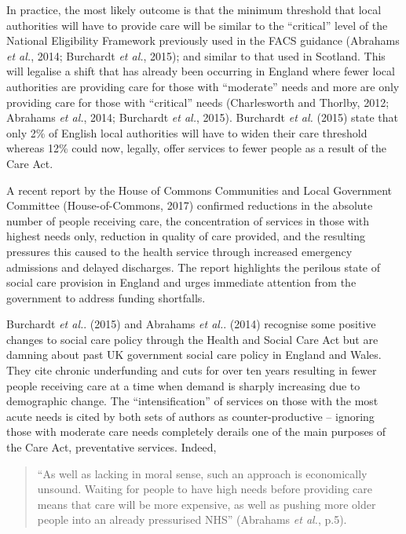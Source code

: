 \documentclass[12pt,a4paper,oneside,table]{report}
\begin{document}
In practice, the most likely outcome is that the minimum threshold that
local authorities will have to provide care will be similar to the
``critical'' level of the National Eligibility Framework previously used
in the FACS guidance (Abrahams \emph{et al.}, 2014; Burchardt \emph{et
al.}, 2015); and similar to that used in Scotland. This will legalise a
shift that has already been occurring in England where fewer local
authorities are providing care for those with ``moderate'' needs and
more are only providing care for those with ``critical'' needs
(Charlesworth and Thorlby, 2012; Abrahams \emph{et al.}, 2014; Burchardt
\emph{et al.}, 2015). Burchardt \textit{et al.} (2015) state that only
2\% of English local authorities will have to widen their care threshold
whereas 12\% could now, legally, offer services to fewer people as a
result of the Care Act.

A recent report by the House of Commons Communities and Local Government
Committee (House-of-Commons, 2017) confirmed reductions in the absolute
number of people receiving care, the concentration of services in those
with highest needs only, reduction in quality of care provided, and the
resulting pressures this caused to the health service through increased
emergency admissions and delayed discharges. The report highlights the
perilous state of social care provision in England and urges immediate
attention from the government to address funding shortfalls.

Burchardt \textit{et al.}. (2015) and Abrahams \textit{et al.}. (2014)
recognise some positive changes to social care policy through the Health
and Social Care Act but are damning about past UK government social care
policy in England and Wales. They cite chronic underfunding and cuts for
over ten years resulting in fewer people receiving care at a time when
demand is sharply increasing due to demographic change. The
``intensification'' of services on those with the most acute needs is
cited by both sets of authors as counter-productive -- ignoring those
with moderate care needs completely derails one of the main purposes of
the Care Act, preventative services. Indeed,

\begin{quotation}
    “As well as lacking in moral sense, such an approach is economically unsound. Waiting for people to have high needs before providing care means that care will be more expensive, as well as pushing more older people into an already pressurised NHS” \hfill (Abrahams \textit{et al.}, p.5). \end{quotation}
\end{document}
